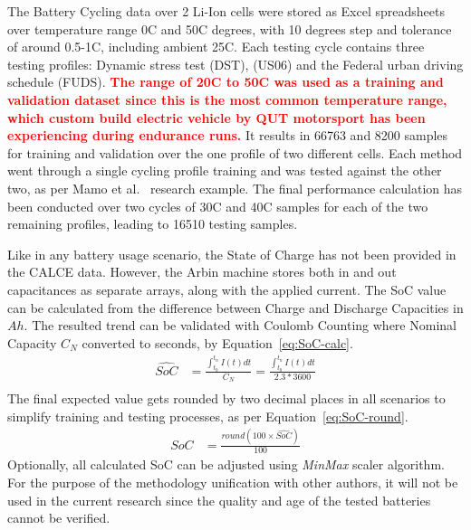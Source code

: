 %
%
The Battery Cycling data over 2 Li-Ion cells were stored as Excel spreadsheets over temperature range 0\textdegree{}C and 50\textdegree{}C degrees, with 10 degrees step and tolerance of around 0.5-1\textdegree{}C, including ambient 25\textdegree{}C.
Each testing cycle contains three testing profiles: Dynamic stress test (DST), (US06) and the Federal urban driving schedule (FUDS).
\textcolor{red}{\textbf{The range of 20\textdegree{}C to 50\textdegree{}C was used as a training and validation dataset since this is the most common temperature range, which custom build electric vehicle by QUT motorsport has been experiencing during endurance runs.}}
It results in 66763 and 8200 samples for training and validation over the one profile of two different cells.
Each method went through a single cycling profile training and was tested against the other two, as per Mamo et al.~\cite{mamo_long_2020} research example.
The final performance calculation has been conducted over two cycles of 30\textdegree{}C and 40\textdegree{}C samples for each of the two remaining profiles, leading to 16510 testing samples.

%
Like in any battery usage scenario, the State of Charge has not been provided in the CALCE data.
However, the Arbin machine stores both in and out capacitances as separate arrays, along with the applied current.
The SoC value can be calculated from the difference between Charge and Discharge Capacities in $Ah$.
The resulted trend can be validated with Coulomb Counting where Nominal Capacity $C_{N}$ converted to seconds, by \mbox{Equation~\ref{eq:SoC-calc}}.
\begin{equation}
    \begin{split}
        \hat{SoC} &= \frac{\int_{t_0}^{t_n} I(t)dt} {C_{N}} = \frac{\int_{t_0}^{t_n} I(t)dt} {2.3*3600} \\
        \label{eq:SoC-calc}
    \end{split}
\end{equation}
The final expected value gets rounded by two decimal places in all scenarios to simplify training and testing processes, as per Equation~\ref{eq:SoC-round}. 
\begin{equation}
    \begin{split}
        SoC &= \frac{round(100\times\hat{SoC})}{100}
        \label{eq:SoC-round}
    \end{split}
\end{equation}
Optionally, all calculated SoC can be adjusted using \textit{MinMax} scaler algorithm.
For the purpose of the methodology unification with other authors, it will not be used in the current research since the quality and age of the tested batteries cannot be verified.
